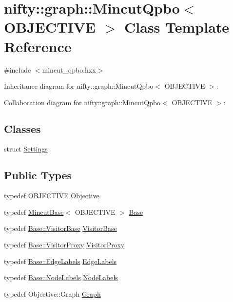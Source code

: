 \hypertarget{classnifty_1_1graph_1_1MincutQpbo}{}\section{nifty\+:\+:graph\+:\+:Mincut\+Qpbo$<$ O\+B\+J\+E\+C\+T\+I\+V\+E $>$ Class Template Reference}
\label{classnifty_1_1graph_1_1MincutQpbo}


{\ttfamily \#include $<$mincut\+\_\+qpbo.\+hxx$>$}



Inheritance diagram for nifty\+:\+:graph\+:\+:Mincut\+Qpbo$<$ O\+B\+J\+E\+C\+T\+I\+V\+E $>$\+:


Collaboration diagram for nifty\+:\+:graph\+:\+:Mincut\+Qpbo$<$ O\+B\+J\+E\+C\+T\+I\+V\+E $>$\+:
\subsection*{Classes}
\begin{DoxyCompactItemize}
\item 
struct \hyperlink{structnifty_1_1graph_1_1MincutQpbo_1_1Settings}{Settings}
\end{DoxyCompactItemize}
\subsection*{Public Types}
\begin{DoxyCompactItemize}
\item 
typedef O\+B\+J\+E\+C\+T\+I\+V\+E \hyperlink{classnifty_1_1graph_1_1MincutQpbo_a1a2e13cc74cf8ec2bceeb80e73f8b002}{Objective}
\item 
typedef \hyperlink{classnifty_1_1graph_1_1MincutBase}{Mincut\+Base}$<$ O\+B\+J\+E\+C\+T\+I\+V\+E $>$ \hyperlink{classnifty_1_1graph_1_1MincutQpbo_a1d73d1ad9b1e67507b740a1cece14f53}{Base}
\item 
typedef \hyperlink{classnifty_1_1graph_1_1MincutBase_a5ba378dc5a1fc073eb9449ca635e7648}{Base\+::\+Visitor\+Base} \hyperlink{classnifty_1_1graph_1_1MincutQpbo_a1ddac4de726b9fcfac58799ab32f3025}{Visitor\+Base}
\item 
typedef \hyperlink{classnifty_1_1graph_1_1MincutBase_ae42805a72a13d7703d940675a6c90cd9}{Base\+::\+Visitor\+Proxy} \hyperlink{classnifty_1_1graph_1_1MincutQpbo_a89d9a6ede7906b5d0afd49fbb873a6fb}{Visitor\+Proxy}
\item 
typedef \hyperlink{classnifty_1_1graph_1_1MincutBase_a79320522726432c6f7e2f2b2c632683e}{Base\+::\+Edge\+Labels} \hyperlink{classnifty_1_1graph_1_1MincutQpbo_ac2e16f00a684f1d286291ea6323100fc}{Edge\+Labels}
\item 
typedef \hyperlink{classnifty_1_1graph_1_1MincutBase_a9dc6555e37d38de23f194f87ca1497d5}{Base\+::\+Node\+Labels} \hyperlink{classnifty_1_1graph_1_1MincutQpbo_a6c5fd1d59ebe854e4aafec08563cd91c}{Node\+Labels}
\item 
typedef Objective\+::\+Graph \hyperlink{classnifty_1_1graph_1_1MincutQpbo_a691cbebde5937ac4ca942a5ac2eecb92}{Graph}
\end{DoxyCompactItemize}
